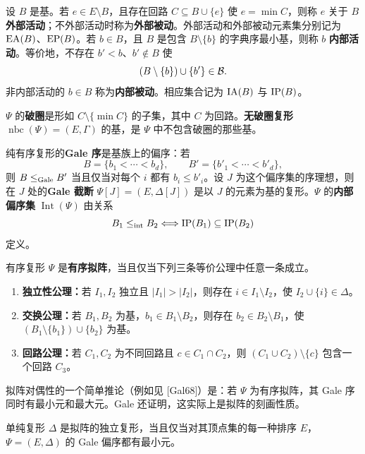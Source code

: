 设 $B$ 是基。若 $e\in E\setminus B$，且存在回路 $C\subseteq B\cup\{e\}$ 使 $e=\min C$，则称 $e$ 关于 $B$ \textbf{外部活动}；不外部活动时称为\textbf{外部被动}。外部活动和外部被动元素集分别记为 $\operatorname{EA}(B)$、$\operatorname{EP}(B)$。若 $b\in B$，且 $B$ 是包含 $B\setminus\{b\}$ 的字典序最小基，则称 $b$ \textbf{内部活动}。等价地，不存在 $b'<b$、$b'\notin B$ 使
\[
(B\setminus\{b\})\cup\{b'\}\in\mathcal B.
\]
非内部活动的 $b\in B$ 称为\textbf{内部被动}。相应集合记为 $\operatorname{IA}(B)$ 与 $\operatorname{IP}(B)$。

$\Psi$ 的\textbf{破圈}是形如 $C\setminus\{\min C\}$ 的子集，其中 $C$ 为回路。\textbf{无破圈复形} $\operatorname{nbc}(\Psi)=(E,\Gamma)$ 的基，是 $\Psi$ 中不包含破圈的那些基。

纯有序复形的\textbf{Gale 序}是基族上的偏序：若
\[
B=\{b_1<\cdots<b_d\},\qquad B'=\{b'_1<\cdots<b'_d\},
\]
则 $B\le_{\mathrm{Gale}}B'$ 当且仅当对每个 $i$ 都有 $b_i\le b'_i$。设 $J$ 为这个偏序集的序理想，则在 $J$ 处的\textbf{Gale 截断} $\Psi[J]=(E,\Delta[J])$ 是以 $J$ 的元素为基的复形。$\Psi$ 的\textbf{内部偏序集} $\operatorname{Int}(\Psi)$ 由关系
\[
B_1\le_{\rm int}B_2\Longleftrightarrow\operatorname{IP}(B_1)\subseteq\operatorname{IP}(B_2)
\]
定义。

有序复形 $\Psi$ 是\textbf{有序拟阵}，当且仅当下列三条等价公理中任意一条成立。
\begin{enumerate}[label=\roman*.]
\item \textbf{独立性公理：}若 $I_1,I_2$ 独立且 $|I_1|>|I_2|$，则存在 $i\in I_1\setminus I_2$，使 $I_2\cup\{i\}\in\Delta$。
\item \textbf{交换公理：}若 $B_1,B_2$ 为基，$b_1\in B_1\setminus B_2$，则存在 $b_2\in B_2\setminus B_1$，使 $(B_1\setminus\{b_1\})\cup\{b_2\}$ 为基。
\item \textbf{回路公理：}若 $C_1,C_2$ 为不同回路且 $c\in C_1\cap C_2$，则 $(C_1\cup C_2)\setminus\{c\}$ 包含一个回路 $C_3$。
\end{enumerate}

拟阵对偶性的一个简单推论（例如见 [Gal68]）是：若 $\Psi$ 为有序拟阵，其 Gale 序同时有最小元和最大元。Gale 还证明，这实际上是拟阵的刻画性质。

单纯复形 $\Delta$ 是拟阵的独立复形，当且仅当对其顶点集的每一种排序 $E$，$\Psi=(E,\Delta)$ 的 Gale 偏序都有最小元。

